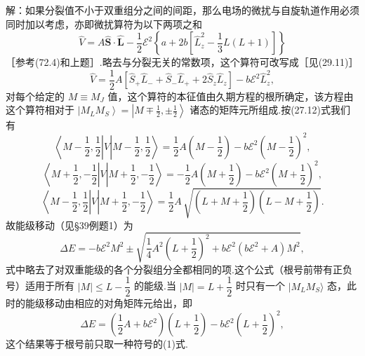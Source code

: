 \begin{xiti}
解：如果分裂值不小于双重组分之间的间距，那么电场的微扰与自旋轨道作用必须同时加以考虑，亦即微扰算符为以下两项之和
\begin{equation*}
  \hat{V}=A\hat{\boldsymbol{S}}\cdot\hat{\boldsymbol{L}}
  -\frac{1}{2}\mathcal{E}^{2}
  \left\{a+2b\left[\hat{L}_z^{2}-\frac{1}{3}L(L+1)\right]\right\}
\end{equation*}
［参考(72.4)和上题］.略去与分裂无关的常数项，这个算符可改写成［见(29.11)］
\begin{equation*}
  \hat{V}=\frac{1}{2}A\left[\hat{S}_+\hat{L}_-+\hat{S}_-\hat{L}_+
  +2\hat{S}_z\hat{L}_z\right]-b\mathcal{E}^{2}\hat{L}_z^{2},
\end{equation*}
对每个给定的 $M\equiv M_J$ 值，这个算符的本征值由久期方程的根所确定，该方程由这个算符相对于 $\left|M_LM_S\right\rangle=\left|M\mp\frac{1}{2},\pm\frac{1}{2}\right\rangle$ 诸态的矩阵元所组成.按(27.12)式我们有
\begin{equation*}
  \left\langle M-\frac{1}{2},\frac{1}{2}\right|V\left|M-\frac{1}{2},\frac{1}{2}\right\rangle
  =\frac{1}{2}A\left(M-\frac{1}{2}\right)-b\mathcal{E}^{2}\left(M-\frac{1}{2}\right)^{2},
\end{equation*}
\begin{equation*}
  \left\langle M+\frac{1}{2},-\frac{1}{2}\right|V\left|M+\frac{1}{2},-\frac{1}{2}\right\rangle
  =-\frac{1}{2}A\left(M+\frac{1}{2}\right)-b\mathcal{E}^{2}\left(M+\frac{1}{2}\right)^{2},
\end{equation*}
\begin{equation*}
  \left\langle M-\frac{1}{2},\frac{1}{2}\right|V\left|M+\frac{1}{2},-\frac{1}{2}\right\rangle
  =\frac{1}{2}A\,\sqrt{\left(L+M+\frac{1}{2}\right)\left(L-M+\frac{1}{2}\right)}.
\end{equation*}
故能级移动（见§39例题1）为
\setcounter{equation}{0}\renewcommand{\theequation}{\arabic{equation}}%
\begin{equation}
  \Delta E=-b\mathcal{E}^{2}M^{2}
  \pm\sqrt{\frac{1}{4}A^{2}\left(L+\frac{1}{2}\right)^{2}
  +b\mathcal{E}^{2}(b\mathcal{E}^{2}+A)M^{2}},
\end{equation}
式中略去了对双重能级的各个分裂组分全都相同的项.这个公式（根号前带有正负号）适用于所有 $|M|\leqslant L-\dfrac{1}{2}$ 的能级.当 $|M|=L+\dfrac{1}{2}$ 时只有一个 $|M_LM_S\rangle$ 态，此时的能级移动由相应的对角矩阵元给出，即
\begin{equation}
  \Delta E=\left(\frac{1}{2}A+b\mathcal{E}^{2}\right)\left(L+\frac{1}{2}\right)
  -b\mathcal{E}^{2}\left(L+\frac{1}{2}\right)^{2},
\end{equation}
这个结果等于根号前只取一种符号的(1)式.


\end{xiti}

